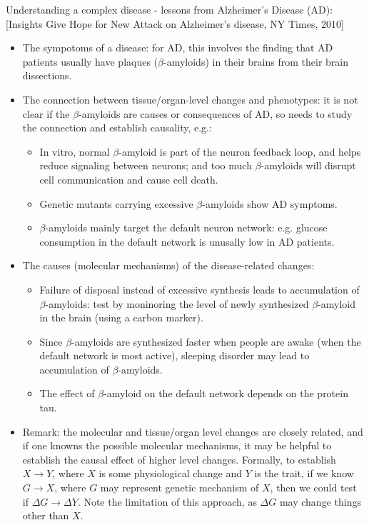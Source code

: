 \documentclass{report}
\begin{document}
Understanding a complex disease - lessons from Alzheimer's Disease (AD): [Insights Give Hope for New Attack on Alzheimer's disease, NY Times, 2010]
\begin{itemize}
\item The sympotoms of a disease: for AD, this involves the finding that AD patients usually have plaques ($\beta$-amyloids) in their brains from their brain dissections. 

\item The connection between tissue/organ-level changes and phenotypes: it is not clear if the $\beta$-amyloids are causes or consequences of AD, so needs to study the connection and establish causality, e.g.: 
\begin{itemize}
\item In vitro, normal $\beta$-amyloid is part of the neuron feedback loop, and helps reduce signaling between neurons; and too much $\beta$-amyloids will disrupt cell communication and cause cell death. 
\item Genetic mutants carrying excessive $\beta$-amyloids show AD symptoms. 
\item $\beta$-amyloids mainly target the default neuron network: e.g. glucose consumption in the default network is unusally low in AD patients. 
\end{itemize}

\item The causes (molecular mechanisms) of the disease-related changes: 
\begin{itemize}
\item Failure of disposal instead of excessive synthesis leads to accumulation of $\beta$-amyloids: test by moninoring the level of newly synthesized $\beta$-amyloid in the brain (using a carbon marker). 
\item Since $\beta$-amyloids are synthesized faster when people are awake (when the default network is most active), sleeping disorder may lead to accumulation of $\beta$-amyloids.
\item The effect of $\beta$-amyloid on the default network depends on the protein tau.  
\end{itemize}

\item Remark: the molecular and tissue/organ level changes are closely related, and if one knowns the possible molecular mechanisms, it may be helpful to establish the causal effect of higher level changes. Formally, to establish $X \rightarrow Y$, where $X$ is some physiological change and $Y$ is the trait, if we know $G \rightarrow X$, where $G$ may represent genetic mechanism of $X$, then we could test if $\Delta G \rightarrow \Delta Y$. Note the limitation of this approach, as $\Delta G$ may change things other than $X$. 
\end{itemize}
\end{document}
